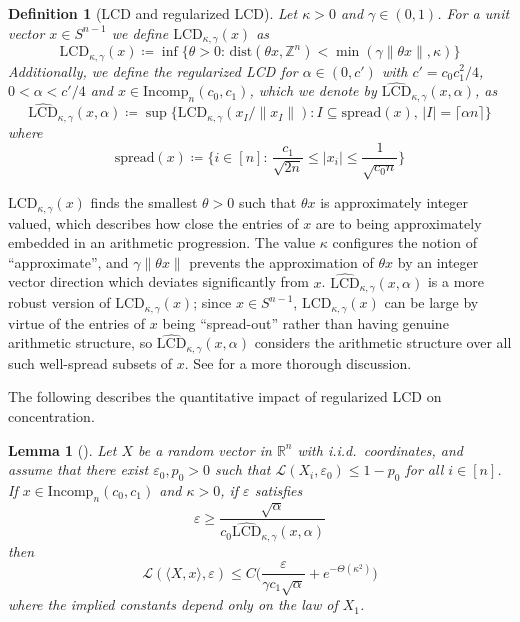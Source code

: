 \documentclass[11pt]{article}
\numberwithin{equation}{section}
\newtheorem{lemma}[theorem]{Lemma}
\newtheorem{definition}[theorem]{Definition}
\theoremstyle{remark}
\newcommand{\R}{\mathbb{R}}
\newcommand{\Z}{\mathbb{Z}}
\newcommand{\LevyFunc}{\mathcal{L}}
\newcommand{\Incomp}{\mathrm{Incomp}}
\newcommand{\LCD}{\mathrm{LCD}}
\newcommand{\rLCD}{\widehat{\mathrm{LCD}}}
\newcommand{\dist}{\mathrm{dist}}
\newcommand{\spread}{\mathrm{spread}}
\begin{document}
\begin{definition}[LCD and regularized LCD]\label{def-lcd}
    Let $\kappa > 0$ and $\gamma \in (0, 1)$. For a unit vector $x \in S^{n - 1}$ we define $\LCD_{\kappa, \gamma}(x)$ as 
    \begin{equation*}
        \LCD_{\kappa, \gamma}(x) \coloneqq \inf \{ \theta > 0: \, \dist(\theta x, \Z^{n}) < \min(\gamma \|\theta x \|, \kappa) \}
    \end{equation*}
    Additionally, we define the regularized LCD for $\alpha \in (0, c')$ with $c' = c_0 c_1^2 /4$, $0 < \alpha < c'/4$ and $x \in \Incomp_n(c_0, c_1)$, which we denote by $\rLCD_{\kappa, \gamma}(x, \alpha)$, as
    \begin{equation*}
        \rLCD_{\kappa, \gamma}(x, \alpha) \coloneqq \sup \{ \LCD_{\kappa, \gamma}(x_I/\|x_I\|): I \subseteq \spread(x), \, |I| =  \lceil \alpha n \rceil \}
    \end{equation*}
    where 
    \begin{equation*}
        \spread(x) \coloneqq \{i \in [n]: \, \frac{c_1}{\sqrt{2n}} \leq |x_i| \leq \frac{1}{\sqrt{c_0 n}} \}
    \end{equation*}
\end{definition}

$\LCD_{\kappa, \gamma}(x)$ finds the smallest $\theta > 0$ such that $\theta x$ is approximately integer valued, which describes how close the entries of $x$ are to being approximately embedded in an arithmetic progression. The value $\kappa$ configures the notion of ``approximate'', and $\gamma \|\theta x \|$ prevents the approximation of $\theta x$ by an integer vector direction which deviates significantly from $x$. $\rLCD_{\kappa, \gamma}(x, \alpha)$ is a more robust version of $\LCD_{\kappa, \gamma}(x)$; since $x \in S^{n - 1}$, $\LCD_{\kappa, \gamma}(x)$ can be large by virtue of the entries of $x$ being ``spread-out'' rather than having genuine arithmetic structure, so $\rLCD_{\kappa, \gamma}(x, \alpha)$ considers the arithmetic structure over all such well-spread subsets of $x$. See \cite{rudelson2010lecture} for a more thorough discussion.

The following describes the quantitative impact of regularized LCD on concentration.

\begin{lemma}[{\cite[Lemma 4.1]{christoffersen2025gaps}}]\label{lem-lcd-helper-concentration}
    Let $X$ be a random vector in $\R^n$ with i.i.d.\ coordinates, and assume that there exist $\varepsilon_0, p_0 > 0$ such that $\LevyFunc(X_i, \varepsilon_0) \leq 1 - p_0$ for all $i \in [n]$. If $x \in \Incomp_n(c_0, c_1)$ and $\kappa > 0$, if $\varepsilon$ satisfies 
    \begin{equation*}
        \varepsilon \geq \frac{\sqrt{\alpha}}{c_0 \rLCD_{\kappa, \gamma}(x, \alpha)}
    \end{equation*}
    then 
    \begin{equation}
        \LevyFunc(\langle X, x \rangle, \varepsilon) \leq C \bigg( \frac{\varepsilon}{\gamma c_1 \sqrt{\alpha}} + e^{-\Theta(\kappa^2)} \bigg)
    \end{equation}
    where the implied constants depend only on the law of $X_1$.
\end{lemma}
\end{document}

